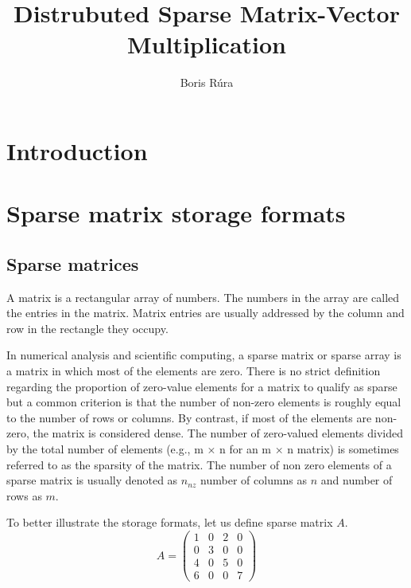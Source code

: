 \documentclass[thesis=M,english]{FITthesis}[2019/12/23]
\title{Distrubuted Sparse Matrix-Vector Multiplication}
\author{Boris Rúra} %
\begin{document}
\tableofcontents

\chapter{Introduction}


\chapter{Sparse matrix storage formats}


\section{Sparse matrices}

A matrix is a rectangular array of numbers. The numbers in the array
are called the entries in the matrix. \cite{anton14} Matrix entries are usually addressed
by the column and row in the rectangle they occupy.

In numerical analysis and scientific computing, a sparse matrix or sparse array
is a matrix in which most of the elements are zero. There is no strict definition
regarding the proportion of zero-value elements for a matrix to qualify as sparse
but a common criterion is that the number of non-zero elements is roughly equal
to the number of rows or columns. By contrast, if most of the elements are non-zero,
the matrix is considered dense.
The number of zero-valued elements divided by the total number of elements (e.g., m × n for an m × n matrix) is sometimes referred to as the sparsity of the matrix.
\cite{efficientSDMM} The number of non zero elements of a sparse matrix is usually denoted
as $n_{nz}$ number of columns as $n$ and number of rows as $m$.

To better illustrate the storage formats, let us define sparse matrix $A$.
\begin{equation*}
    A =
    \begin{pmatrix}
        1 & 0 & 2 & 0 \\
        0 & 3 & 0 & 0 \\
        4 & 0 & 5 & 0 \\
        6 & 0 & 0 & 7
    \end{pmatrix}
\end{equation*}
\end{document}

